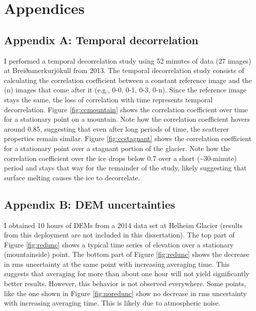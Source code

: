 \chapter*{Appendices}
\setcounter{figure}{0}
\renewcommand{\thefigure}{A\arabic{figure}}

\newpage
\section*{Appendix A: Temporal decorrelation}

I performed a temporal decorrelation study using 52 minutes of data (27 images) at Breiðamerkurjökull from 2013. The temporal decorrelation study consists of calculating the correlation coefficient between a constant reference image and the (n) images that come after it (e.g., 0-0, 0-1, 0-3, 0-n). Since the reference image stays the same, the loss of correlation with time represents temporal decorrelation. 
 Figure \ref{fig:ccmountain} shows the correlation coefficient over time for a stationary point on a mountain. Note how the correlation coefficient hovers around 0.85, suggesting that even after long periods of time, the scatterer properties remain similar. Figure \ref{fig:ccstagnant} shows the correlation coefficient for a stationary point over a stagnant portion of the glacier. Note how the correlation coefficient over the ice drops below 0.7 over a short (\textasciitilde30-minute) period and stays that way for the remainder of the study, likely suggesting that surface melting causes the ice to decorrelate.
 

\newpage
\section*{Appendix B: DEM uncertainties}

I obtained 10 hours of DEMs from a 2014 data set at Helheim Glacier (results from this deployment are not included in this dissertation).  The top part of Figure \ref{fig:redunc} shows a typical time series of elevation over a stationary (mountainside) point. The bottom part of Figure \ref{fig:redunc} shows the decrease in rms uncertainty at the same point with increasing averaging time. This suggests that averaging for more than about one hour will not yield significantly better results. However, this behavior is not observed everywhere. Some points, like the one shown in Figure \ref{fig:noredunc} show no decrease in rms uncertainty with increasing averaging time. This is likely due to atmospheric noise.

